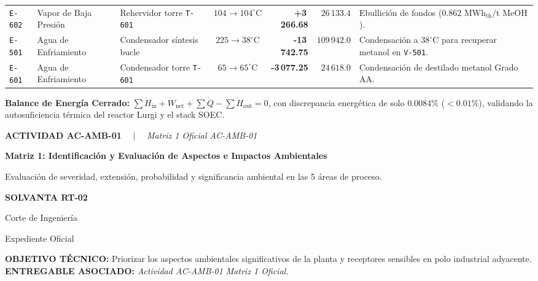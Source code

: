 \documentclass[10pt,landscape]{article}
\newcommand{\slideheader}[4]{%
  \noindent
  \begin{minipage}[c]{0.78\textwidth}
    {\fontsize{7pt}{8.5pt}\selectfont \textbf{\color{accentcyan}#1} \ \ $|$ \ \ \textit{\color{black!70}#2}}\par
    \vspace{1.5pt}
    {\fontsize{12pt}{14pt}\selectfont \textbf{\color{navyblue}#3}}\par
    \vspace{1.5pt}
    {\fontsize{7.2pt}{8.8pt}\selectfont \color{black!80}#4}
  \end{minipage}
  \hfill
  \begin{minipage}[c]{0.20\textwidth}
    \begin{tcolorbox}[colback=navyblue,colframe=navyblue,arc=1.5mm,boxrule=0pt,top=2.5pt,bottom=2.5pt,left=4pt,right=4pt]
      \centering
      {\color{white}\fontsize{7.5pt}{9pt}\selectfont \textbf{SOLVANTA RT-02}}\par
      \vspace{1pt}
      {\color{accentcyan}\fontsize{6pt}{7.5pt}\selectfont Corte de Ingeniería}\par
      {\color{white!80}\fontsize{5.5pt}{7pt}\selectfont Expediente Oficial}
    \end{tcolorbox}
  \end{minipage}
  \par\vspace{2pt}
  \noindent{\color{navyblue}\rule{\textwidth}{1.0pt}}
  \par\vspace{2pt}
}
\newenvironment{objectivebox}[2]{%
  \begin{tcolorbox}[
    colback=softblue,
    colframe=accentcyan,
    arc=1.5mm,
    boxrule=0.7pt,
    top=2pt,
    bottom=2pt,
    left=6pt,
    right=6pt
  ]
    \noindent
    \textbf{\fontsize{6.5pt}{7.8pt}\selectfont \color{navyblue}OBJETIVO TÉCNICO:} 
    {\fontsize{6.5pt}{7.8pt}\selectfont #1}
    \hfill
    \textbf{\fontsize{6.5pt}{7.8pt}\selectfont \color{navyblue}ENTREGABLE ASOCIADO:} 
    {\fontsize{6.5pt}{7.8pt}\selectfont \textit{#2}}
  \end{tcolorbox}
  \vspace{1.5pt}
}{}
\begin{document}
\begin{tabularx}{\textwidth}{l p{3.2cm} p{3.4cm} c r r X}
  \rowcolor{roweven}
  \texttt{E-602} & Vapor de Baja Presión & Rehervidor torre \texttt{T-601} & $104 \to 104^\circ\text{C}$ & \textbf{+3\,266.68} & $26\,133.4$ & Ebullición de fondos ($0.862\text{ MWh}_{\text{th}}\text{/t MeOH}$). \\
  \rowcolor{rowodd}
  \texttt{E-501} & Agua de Enfriamiento & Condensador síntesis bucle & $225 \to 38^\circ\text{C}$ & \textbf{-13\,742.75} & $109\,942.0$ & Condensación a $38^\circ\text{C}$ para recuperar metanol en \texttt{V-501}. \\
  \rowcolor{roweven}
  \texttt{E-601} & Agua de Enfriamiento & Condensador torre \texttt{T-601} & $65 \to 65^\circ\text{C}$ & \textbf{-3\,077.25} & $24\,618.0$ & Condensación de destilado metanol Grado AA. \\
  \bottomrule
\end{tabularx}

\vspace{2pt}
\begin{tcolorbox}[colback=white,colframe=navyblue!40,arc=1.5mm,boxrule=0.6pt,top=2pt,bottom=2pt,left=6pt,right=6pt]
  \scriptsize
  \textbf{\color{navyblue}Balance de Energía Cerrado:} $\sum \dot{H}_{\text{in}} + \dot{W}_{\text{net}} + \sum \dot{Q} - \sum \dot{H}_{\text{out}} = 0$, con discrepancia energética de solo $\mathbf{0.0084\%}$ ($<0.01\%$), validando la autosuficiencia térmica del reactor Lurgi y el stack SOEC.
\end{tcolorbox}

\newpage

\slideheader{ACTIVIDAD AC-AMB-01}{Matriz 1 Oficial AC-AMB-01}{Matriz 1: Identificación y Evaluación de Aspectos e Impactos Ambientales}{Evaluación de severidad, extensión, probabilidad y significancia ambiental en las 5 áreas de proceso.}

\begin{objectivebox}{Priorizar los aspectos ambientales significativos de la planta y receptores sensibles en polo industrial adyacente.}{Actividad AC-AMB-01 Matriz 1 Oficial.}
\end{objectivebox}

\vspace{1.5pt}
\end{document}
